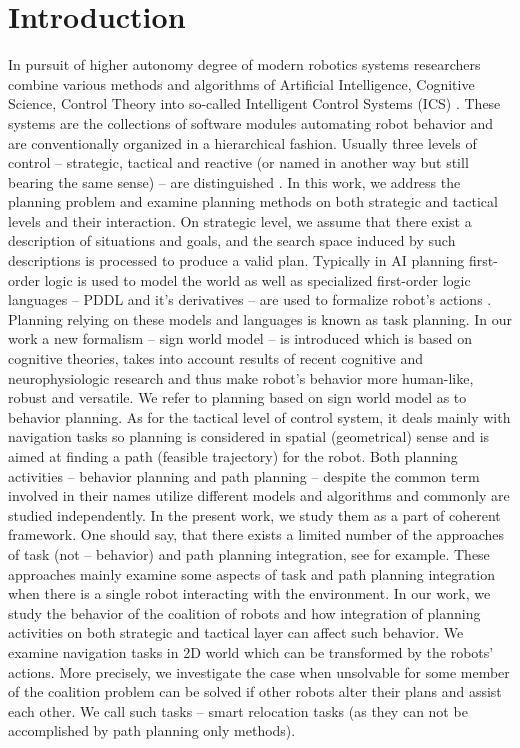 \documentclass[runningheads,a4paper]{llncs}
\begin{document}
\section{Introduction}

In pursuit of higher autonomy degree of modern robotics systems researchers combine various methods and algorithms of Artificial Intelligence, Cognitive Science, Control Theory into so-called Intelligent Control Systems (ICS) \cite{Albus2002,Yoo2015}. These systems are the collections of software modules automating robot behavior and are conventionally organized in a hierarchical fashion. Usually three levels of control – strategic, tactical and reactive (or named in another way but still bearing the same sense) – are distinguished \cite{Emelyanov2015}. In this work, we address the planning problem and examine planning methods on both strategic and tactical levels and their interaction. On strategic level, we assume that there exist a description of situations and goals, and the search space induced by such descriptions is processed to produce a valid plan. Typically in AI planning \cite{Ghallab2004} first-order logic is used to model the world as well as specialized first-order logic languages – PDDL and it's derivatives – are used to formalize robot's actions \cite{Ghallab1998,Fox2003}. Planning relying on these models and languages is known as task planning. In our work a new formalism – sign world model – is introduced which is based on cognitive theories, takes into account results of recent cognitive and neurophysiologic research and thus make robot's behavior more human-like, robust and versatile. We refer to planning based on sign world model as to behavior planning. As for the tactical level of control system, it deals mainly with navigation tasks so planning is considered in spatial (geometrical) sense and is aimed at finding a path (feasible trajectory) for the robot. Both planning activities – behavior planning and path planning – despite the common term involved in their names utilize different models and algorithms and commonly are studied independently. In the present work, we study them as a part of coherent framework. One should say, that there exists a limited number of the approaches of task (not – behavior) and path planning integration, see \cite{Karlsson2012,Abdo2012} for example. These approaches mainly examine some aspects of task and path planning integration when there is a single robot interacting with the environment. In our work, we study the behavior of the coalition of robots and how integration of planning activities on both strategic and tactical layer can affect such behavior. We examine navigation tasks in 2D world which can be transformed by the robots' actions. More precisely, we investigate the case when unsolvable for some member of the coalition problem can be solved if other robots alter their plans and assist each other. We call such tasks – smart relocation tasks (as they can not be accomplished by path planning only methods).
\end{document}
